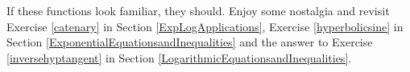 \documentclass{ximera}
\begin{document}
\begin{question}
\begin{problem}
If these functions look familiar, they should.  Enjoy some nostalgia and revisit Exercise \ref{catenary} in Section \ref{ExpLogApplications}, Exercise \ref{hyperbolicsine} in Section \ref{ExponentialEquationsandInequalities} and the  answer to Exercise \ref{inversehyptangent} in Section \ref{LogarithmicEquationsandInequalities}. \label{hyperboliclast}
\end{problem}

\end{question}
\end{document}
